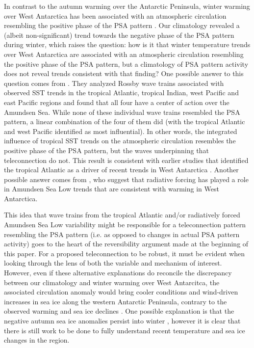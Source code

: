 In contrast to the autumn warming over the Antarctic Peninsula, winter warming over West Antarctica has been associated with an atmospheric circulation resembling the positive phase of the PSA pattern \citep{Ding2011}. Our climatology revealed a (albeit non-significant) trend towards the negative phase of the PSA pattern during winter, which raises the question: how is it that winter temperature trends over West Antarctica are associated with an atmospheric circulation resembling the positive phase of the PSA pattern, but a climatology of PSA pattern activity does not reveal trends consistent with that finding? One possible answer to this question comes from \citet{Li2015a}. They analyzed Rossby wave trains associated with observed SST trends in the tropical Atlantic, tropical Indian, west Pacific and east Pacific regions and found that all four have a center of action over the Amundsen Sea. While none of these individual wave trains resembled the PSA pattern, a linear combination of the four of them did (with the tropical Atlantic and west Pacific identified as most influential). In other words, the integrated influence of tropical SST trends on the atmospheric circulation resembles the positive phase of the PSA pattern, but the waves underpinning that teleconnection do not. This result is consistent with earlier studies that identified the tropical Atlantic as a driver of recent trends in West Antarctica \citep{Li2014,Simpkins2014}. Another possible answer comes from \citet{Fogt2015}, who suggest that radiative forcing has played a role in Amundsen Sea Low trends that are consistent with warming in West Antarctica. 

This idea that wave trains from the tropical Atlantic and/or radiatively forced Amundsen Sea Low variability might be responsible for a teleconnection pattern resembling the PSA pattern (i.e. as opposed to changes in actual PSA pattern activity) goes to the heart of the reversibility argument made at the beginning of this paper. For a proposed teleconnection to be robust, it must be evident when looking through the lens of both the variable and mechanism of interest. However, even if these alternative explanations do reconcile the discrepancy between our climatology and winter warming over West Antarcitca, the associated circulation anomaly would bring cooler conditions and wind-driven increases in sea ice along the western Antarctic Peninsula, contrary to the observed warming and sea ice declines \citep{Clem2015}. One possible explanation is that the negative autumn sea ice anomalies persist into winter \citep{Ding2013}, however it is clear that there is still work to be done to fully understand recent temperature and sea ice changes in the region.

